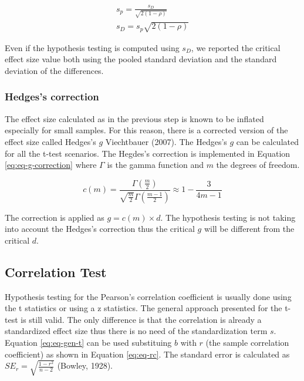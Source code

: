 \documentclass[
  man]{apa7}
\begin{document}
\begin{equation}
    \label{eq:eq-sp-sd}
    \begin{gathered}
        s_p =  \frac{s_D}{\sqrt{2(1 - \rho)}} \\
        s_D =  s_p \sqrt{2(1 - \rho)}
    \end{gathered}
\end{equation}

Even if the hypothesis testing is computed using \(s_D\), we reported the critical effect size value both using the pooled standard deviation and the standard deviation of the differences.

\hypertarget{hedgess-correction}{%
\subsubsection{Hedges's correction}\label{hedgess-correction}}

The effect size calculated as in the previous step is known to be inflated especially for small samples. For this reason, there is a corrected version of the effect size called Hedges's \(g\) Viechtbauer (2007). The Hedges's \(g\) can be calculated for all the t-test scenarios. The Hegdes's correction is implemented in Equation \eqref{eq:eq-g-correction} where \(\Gamma\) is the gamma function and \(m\) the degrees of freedom.

\begin{equation}
\label{eq:eq-g-correction}
c(m) = \frac{\Gamma\left(\frac{m}{2}\right)}{\sqrt{\frac{m}{2}} \Gamma\left(\frac{m-1}{2}\right)} \approx 1 - \frac{3}{4m - 1}
\end{equation}

The correction is applied as \(g = c(m) \times d\). The hypothesis testing is not taking into account the Hedges's correction thus the critical \(g\) will be different from the critical \(d\).

\hypertarget{correlation-test}{%
\subsection{Correlation Test}\label{correlation-test}}

Hypothesis testing for the Pearson's correlation coefficient is usually done using the t statistics or using a z statistics. The general approach presented for the t-test is still valid. The only difference is that the correlation is already a standardized effect size thus there is no need of the standardization term \(s\). Equation \eqref{eq:eq-gen-t} can be used substituing \(b\) with \(r\) (the sample correlation coefficient) as shown in Equation \eqref{eq:eq-rc}. The standard error is calculated as \(SE_r = \sqrt{\frac{1 - r^2}{n - 2}}\) (Bowley, 1928).
\end{document}
